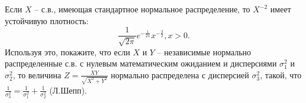 \begin{problem}

Если $X$ -- с.в., имеющая стандартное нормальное распределение, то $X^{-2} $ имеет устойчивую плотность:
\[\frac{1}{\sqrt{2\pi } } e^{-\frac{1}{2x} } x^{-\frac{3}{2} } , x>0.\] 
Используя это, покажите, что если $X$ и $Y$ -- независимые нормально распределенные с.в. с нулевым математическим ожиданием и дисперсиями $\sigma _{1}^{2} $ и $\sigma _{2}^{2} $, то величина $Z=\frac{XY}{\sqrt{X^{2} +Y^{2} } } $ нормально распределена с дисперсией $\sigma _{3}^{2} $, такой, что $\frac{1}{\sigma _{3}^{2} } =\frac{1}{\sigma _{1}^{2} } +\frac{1}{\sigma _{2}^{2} } $ (Л.Шепп).

\end{problem}